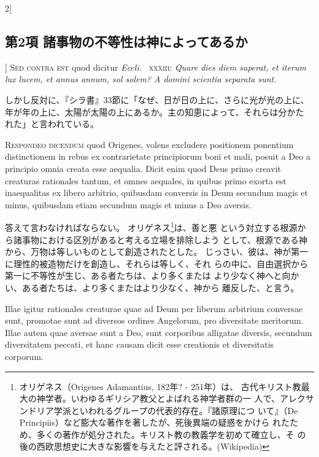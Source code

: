 \documentclass[paper=a4paper,fontsize=10pt,jafontsize=9pt,titlepage]{jlreq}
\begin{document}
\begin{paracol}{2}[\subsection{第2項 諸事物の不等性は神によってあるか}]
{\scshape Sed contra est} quod dicitur {\itshape Eccli.}~{\scshape
xxxiii}: {\itshape Quare dies diem superat, et iterum lux lucem, et
annus annum, sol solem?  A domini scientia separata sunt}.


\switchcolumn


しかし反対に、『シラ書』33節に「なぜ、日が日の上に、さらに光が光の上に、
 年が年の上に、太陽が太陽の上にあるか。主の知恵によって、それらは分かた
 れた」と言われている。




{\scshape Respondeo dicendum} quod Origenes, volens
excludere positionem ponentium distinctionem in rebus ex contrarietate
principiorum boni et mali, posuit a Deo a principio omnia creata esse
aequalia. Dicit enim quod Deus primo creavit creaturas rationales
tantum, et omnes aequales, in quibus primo exorta est inaequalitas ex
libero arbitrio, quibusdam conversis in Deum secundum magis et minus,
quibusdam etiam secundum magis et minus a Deo aversis.


\switchcolumn


答えて言わなければならない。
オリゲネス\footnote{オリゲネス（Origenes Adamantius, 182年? - 251年）は、
 古代キリスト教最大の神学者。いわゆるギリシア教父とよばれる神学者群の一
 人で、アレクサンドリア学派といわれるグループの代表的存在。『諸原理につ
 いて』（De Principiis）など膨大な著作を著したが、死後異端の疑惑をかけら
 れたため、多くの著作が処分された。キリスト教の教義学を初めて確立し、そ
 の後の西欧思想史に大きな影響を与えたと評される。(Wikipedia)}は、善と悪
 という対立する根源から諸事物における区別があると考える立場を排除しよう
 として、根源である神から、万物は等しいものとして創造されたとした。
じっさい、彼は、神が第一に理性的被造物だけを創造し、それらは等しく、それ
 らの中に、自由選択から第一に不等性が生じ、ある者たちは、より多くまたは
 より少なく神へと向かい、ある者たちは、より多くまたはより少なく、神から
 離反した、と言う。


\switchcolumn*


Illae igitur
rationales creaturae quae ad Deum per liberum arbitrium conversae sunt,
promotae sunt ad diversos ordines Angelorum, pro diversitate
meritorum. Illae autem quae aversae sunt a Deo, sunt corporibus
alligatae diversis, secundum diversitatem peccati, et hanc causam dicit
esse creationis et diversitatis corporum.


\switchcolumn



\end{paracol}
\end{document}
